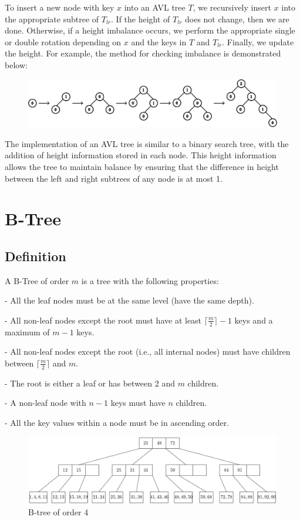 To insert a new node with key \(x\) into an AVL tree \(T\), we recursively insert \(x\) into the appropriate subtree of \(T_{lr}\). If the height of \(T_{lr}\) does not change, then we are done. Otherwise, if a height imbalance occurs, we perform the appropriate single or double rotation depending on \(x\) and the keys in \(T\) and \(T_{lr}\). Finally, we update the height. For example, the method for checking imbalance is demonstrated below:
\begin{figure}[H]
  \centering
  \includegraphics[width=\textwidth]{Figure/AVLInDemo.pdf}
\end{figure}

The implementation of an AVL tree is similar to a binary search tree, with the addition of height information stored in each node. This height information allows the tree to maintain balance by ensuring that the difference in height between the left and right subtrees of any node is at most 1.

\section{B-Tree}
\subsection{Definition}
A B-Tree of order \(m\) is a tree with the following properties:  

- All the leaf nodes must be at the same level (have the same depth).  

- All non-leaf nodes except the root must have at least \(\lceil \frac{m}{2} \rceil - 1\) keys and a maximum of \(m - 1\) keys.  

- All non-leaf nodes except the root (i.e., all internal nodes) must have children between \(\lceil \frac{m}{2} \rceil\) and \(m\).  

- The root is either a leaf or has between 2 and \(m\) children.  

- A non-leaf node with \(n-1\) keys must have \(n\) children.  

- All the key values within a node must be in ascending order.  


\begin{figure}[H]
  \centering
  \includegraphics[width=\textwidth]{Figure/B-Tree.pdf}
  \caption{B-tree of order 4}
\end{figure}

